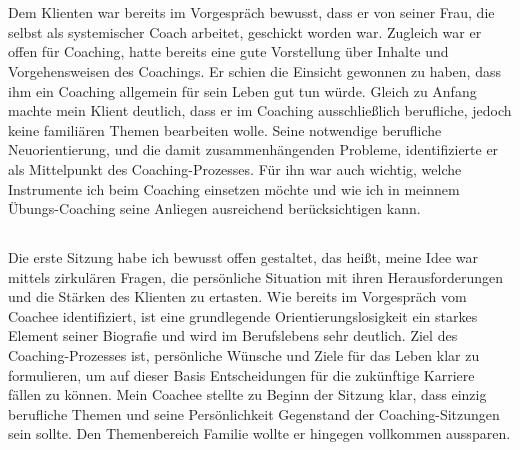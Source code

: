 \documentclass[11pt,a4paper]{article}
\begin{document}
\section*{\color{MidnightBlue}{Coaching-Sitzungen}}



\subsection*{\color{Orange}{Vorgespräch}}

Dem Klienten war bereits im Vorgespräch bewusst, dass er von seiner Frau, die selbst als systemischer Coach arbeitet, geschickt worden war. Zugleich war er offen für Coaching, hatte bereits eine gute Vorstellung über Inhalte und Vorgehensweisen des Coachings. Er schien die Einsicht gewonnen zu haben, dass ihm ein Coaching allgemein für sein Leben gut tun würde. Gleich zu Anfang machte mein Klient deutlich, dass er im Coaching ausschließlich berufliche, jedoch keine familiären Themen bearbeiten wolle. Seine notwendige berufliche Neuorientierung, und die damit zusammenhängenden Probleme, identifizierte er als Mittelpunkt des Coaching-Prozesses. Für ihn war auch wichtig, welche Instrumente ich beim Coaching einsetzen möchte und wie ich in meinnem Übungs-Coaching seine Anliegen ausreichend berücksichtigen kann. 


\subsection*{\color{Orange}{Erste Sitzung: Posititionsbestimmung}}

Die erste Sitzung habe ich bewusst offen gestaltet, das heißt, meine Idee war mittels zirkulären Fragen, die persönliche Situation mit ihren Herausforderungen und die Stärken des Klienten zu ertasten. Wie bereits im Vorgespräch vom Coachee identifiziert, ist eine grundlegende Orientierungslosigkeit ein starkes Element seiner Biografie und wird im  Berufslebens sehr deutlich. Ziel des Coaching-Prozesses ist, persönliche Wünsche und Ziele für das Leben klar zu formulieren, um auf dieser Basis Entscheidungen für die zukünftige Karriere fällen zu können. Mein Coachee stellte zu Beginn der Sitzung klar, dass einzig berufliche Themen und seine Persönlichkeit Gegenstand der Coaching-Sitzungen sein sollte. Den Themenbereich Familie wollte er hingegen vollkommen aussparen.
\end{document}
